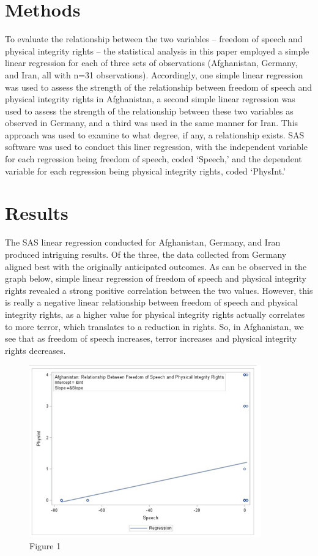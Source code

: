 \documentclass{article}
\begin{document}
\section{Methods}
To evaluate the relationship between the two variables – freedom of speech and physical integrity rights – the statistical analysis in this paper employed a simple linear regression for each of three sets of observations (Afghanistan, Germany, and Iran, all with n=31 observations). Accordingly, one simple linear regression was used to assess the strength of the relationship between freedom of speech and physical integrity rights in Afghanistan, a second simple linear regression was used to assess the strength of the relationship between these two variables as observed in Germany, and a third was used in the same manner for Iran. This approach was used to examine to what degree, if any, a relationship exists. SAS software was used to conduct this liner regression, with the independent variable for each regression being freedom of speech, coded ‘Speech,’ and the dependent variable for each regression being physical integrity rights, coded ‘PhysInt.’


\section{Results}
The SAS linear regression conducted for Afghanistan, Germany, and Iran produced intriguing results. Of the three, the data collected from Germany aligned best with the originally anticipated outcomes. As can be observed in the graph below, simple linear regression of freedom of speech and physical integrity rights revealed a strong positive correlation between the two values. However, this is really a negative linear relationship between freedom of speech and physical integrity rights, as a higher value for physical integrity rights actually correlates to more terror, which translates to a reduction in rights. So, in Afghanistan, we see that as freedom of speech increases, terror increases and physical integrity rights decreases.

\begin{figure}[htp]
    \centering
    \includegraphics[width=10cm]{Afghanistan.png}
    \caption{Figure 1}
    \label{fig:Afghanistan}
\end{figure}
\end{document}

